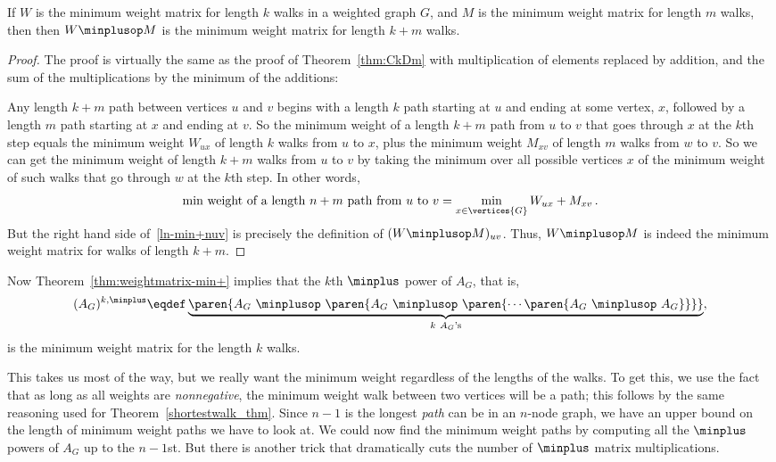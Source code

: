 \begin{theorem}\label{thm:weightmatrix-min+}
  If $W$ is the minimum weight matrix for length $k$ walks in a weighted
  graph $G$, and $M$ is the minimum weight matrix for length $m$ walks,
  then then $W\minplusop M$ is the minimum weight matrix for length $k+m$
  walks.
\end{theorem}

\begin{proof}
  The proof is virtually the same as the proof of Theorem~\ref{thm:CkDm}
  with multiplication of elements replaced by addition, and the sum of the
  multiplications by the minimum of the additions:

  Any length $k+m$ path between vertices $u$ and $v$ begins with a length
  $k$ path starting at $u$ and ending at some vertex, $x$, followed by a
  length $m$ path starting at $x$ and ending at $v$.  So the minimum
  weight of a length $k+m$ path from $u$ to $v$ that goes through $x$ at
  the $k$th step equals the minimum weight $W_{ux}$ of length $k$ walks
  from $u$ to $x$, plus the minimum weight $M_{xv}$ of length $m$ walks
  from $w$ to $v$.  So we can get the minimum weight of length $k+m$ walks
  from $u$ to $v$ by taking the minimum over all possible vertices $x$ of
  the minimum weight of such walks that go through $w$ at the $k$th step.
  In other words,
\begin{equation}\label{ln-min+nuv}
\text{min weight of a length $n+m$ path from $u$ to $v$} =
              \min_{x \in \vertices{G}} W_{ux}+M_{xv}\, .
\end{equation}
But the right hand side of~\eqref{ln-min+nuv} is precisely the definition of
$(W\minplusop M)_{uv}$.  Thus, $W\minplusop M$ is indeed the minimum weight
matrix for walks of length $k+m$.
\end{proof}

Now Theorem~\ref{thm:weightmatrix-min+} implies that the $k$th $\minplus$ power
of $A_G$, that is,
\[
(A_G)^{k, \minplus} \eqdef \underbrace{\paren{A_G\ \minplusop\ \paren{A_G\
      \minplusop\ \paren{\cdots \paren{A_G\ \minplusop\ A_G}} }}}_{k\ A_G\text{'s}},
\]
is the minimum weight matrix for the length $k$ walks.

This takes us most of the way, but we really want the minimum weight
regardless of the lengths of the walks.  To get this, we use the fact that
as long as all weights are \emph{nonnegative}, the minimum weight walk
between two vertices will be a path; this follows by the same reasoning
used for Theorem~\ref{shortestwalk_thm}.  Since $n-1$ is the longest \emph{path}
can be in an $n$-node graph, we have an upper bound on the length of
minimum weight paths we have to look at.  We could now find the minimum
weight paths by computing all the $\minplus$ powers of $A_G$ up to the
$n-1$st.  But there is another trick that dramatically cuts the number of
$\minplus$ matrix multiplications.


